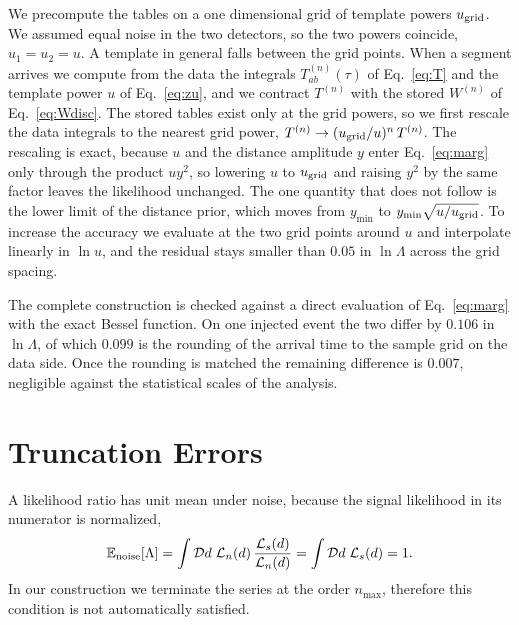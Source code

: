 \documentclass[aps,prd,twocolumn,superscriptaddress,nofootinbib]{revtex4-2}
\begin{document}
We precompute the tables on a one dimensional grid of template
powers $u_{\rm grid}$. We assumed equal noise in the two detectors,
so the two powers coincide, $u_1 = u_2 = u$. A template in general
falls between the grid points. When a segment arrives we compute
from the data the integrals $T^{(n)}_{ab}(\tau)$ of
Eq.~\eqref{eq:T} and the template power $u$ of Eq.~\eqref{eq:zu},
and we contract $T^{(n)}$ with the stored $W^{(n)}$ of
Eq.~\eqref{eq:Wdisc}. The stored tables exist only at the grid
powers, so we first rescale the data integrals to the nearest grid
power, $T^{(n)} \to (u_{\rm grid}/u)^n\, T^{(n)}$. The rescaling is
exact, because $u$ and the distance amplitude $y$ enter
Eq.~\eqref{eq:marg} only through the product $u y^2$, so lowering
$u$ to $u_{\rm grid}$ and raising $y^2$ by the same factor leaves
the likelihood unchanged. The one quantity that does not follow is
the lower limit of the distance prior, which moves from $y_{\min}$
to $y_{\min} \sqrt{u/u_{\rm grid}}$. To increase the accuracy we
evaluate at the two grid points around $u$ and interpolate linearly
in $\ln u$, and the residual stays smaller than $0.05$ in
$\ln \Lambda$ across the grid spacing.

The complete construction is checked against a direct evaluation of
Eq.~\eqref{eq:marg} with the exact Bessel function. On one injected
event the two differ by $0.106$ in $\ln \Lambda$, of which $0.099$
is the rounding of the arrival time to the sample grid on the data
side. Once the rounding is matched the remaining difference is
$0.007$, negligible against the statistical scales of the analysis.

\section{Truncation Errors}
\label{app:norm}

A likelihood ratio has unit mean under noise, because the signal
likelihood in its numerator is normalized,
\begin{equation}
\mathbb{E}_{\rm noise}[\Lambda] = \int \mathcal{D}d\;
\mathcal{L}_n(d)\, \frac{\mathcal{L}_s(d)}{\mathcal{L}_n(d)}
= \int \mathcal{D}d\; \mathcal{L}_s(d) = 1 .
\label{eq:unitmean}
\end{equation}
In our construction we terminate the series at the order $n_{\max}$,
therefore this condition is not automatically satisfied.
\end{document}
